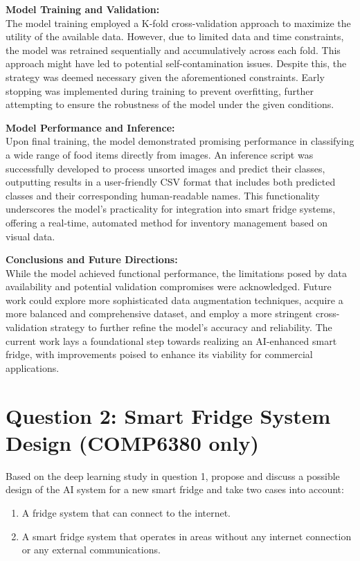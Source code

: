 \documentclass[runningheads]{llncs}
\begin{document}
\noindent\textbf{Model Training and Validation:} \\
The model training employed a K-fold cross-validation approach to maximize the utility of the available data. However, due to limited data and time constraints, the model was retrained sequentially and accumulatively across each fold. This approach might have led to potential self-contamination issues. Despite this, the strategy was deemed necessary given the aforementioned constraints. Early stopping was implemented during training to prevent overfitting, further attempting to ensure the robustness of the model under the given conditions.

\noindent\textbf{Model Performance and Inference:} \\
Upon final training, the model demonstrated promising performance in classifying a wide range of food items directly from images. An inference script was successfully developed to process unsorted images and predict their classes, outputting results in a user-friendly CSV format that includes both predicted classes and their corresponding human-readable names. This functionality underscores the model's practicality for integration into smart fridge systems, offering a real-time, automated method for inventory management based on visual data.

\noindent\textbf{Conclusions and Future Directions:} \\
While the model achieved functional performance, the limitations posed by data availability and potential validation compromises were acknowledged. Future work could explore more sophisticated data augmentation techniques, acquire a more balanced and comprehensive dataset, and employ a more stringent cross-validation strategy to further refine the model's accuracy and reliability. The current work lays a foundational step towards realizing an AI-enhanced smart fridge, with improvements poised to enhance its viability for commercial applications.

\section*{Question 2: Smart Fridge System Design (COMP6380 only)}

\noindent Based on the deep learning study in question 1, propose and discuss a possible design of the AI system for a new smart fridge and take two cases into account:
\begin{enumerate}
    \item A fridge system that can connect to the internet.
    \item A smart fridge system that operates in areas without any internet connection or any external communications.
\end{enumerate}
\end{document}
